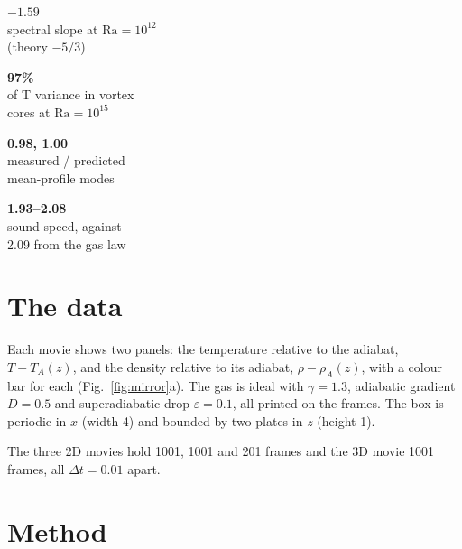 \documentclass[11pt,a4paper]{article}
\begin{document}
\vspace{2pt}
\begin{tcbraster}[raster columns=4,raster equal height,raster column skip=6pt,
  raster every box/.style={enhanced,colback=white,colframe=ink!25,boxrule=0.6pt,arc=3pt,halign=center,left=3pt,right=3pt,top=5pt,bottom=5pt}]
\begin{tcolorbox}{\sffamily\Large\bfseries\color{org12} $-1.59$}\\[-1pt]{\sffamily\scriptsize spectral slope at $\mathrm{Ra}=10^{12}$\\ (theory $-5/3$)}\end{tcolorbox}
\begin{tcolorbox}{\sffamily\Large\bfseries\color{grn15} 97\%}\\[-1pt]{\sffamily\scriptsize of T variance in vortex\\ cores at $\mathrm{Ra}=10^{15}$}\end{tcolorbox}
\begin{tcolorbox}{\sffamily\Large\bfseries\color{ink} 0.98, 1.00}\\[-1pt]{\sffamily\scriptsize measured / predicted\\ mean-profile modes}\end{tcolorbox}
\begin{tcolorbox}{\sffamily\Large\bfseries\color{accent} 1.93--2.08}\\[-1pt]{\sffamily\scriptsize sound speed, against\\ 2.09 from the gas law}\end{tcolorbox}
\end{tcbraster}

\section{The data}
Each movie shows two panels: the temperature relative to the adiabat, $T-T_A(z)$, and the density relative to its adiabat, $\rho-\rho_A(z)$, with a colour bar for each (Fig.~\ref{fig:mirror}a). The gas is ideal with $\gamma=1.3$, adiabatic gradient $D=0.5$ and superadiabatic drop $\varepsilon=0.1$, all printed on the frames. The box is periodic in $x$ (width 4) and bounded by two plates in $z$ (height 1).



The three 2D movies hold 1001, 1001 and 201 frames and the 3D movie 1001 frames, all $\Delta t=0.01$ apart.

\section{Method}
\end{document}
